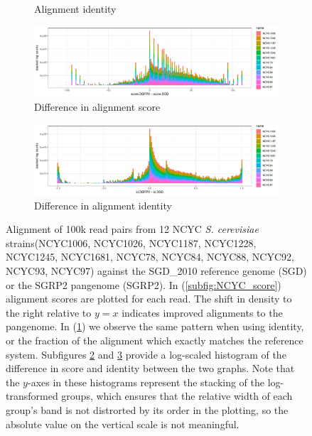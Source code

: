 \begin{figure}[htbp!]
\begin{subfigure}[t]{0.49\textwidth}
    \caption{Alignment identity} \label{subfig:NCYC_identity}
  \end{subfigure}
  \begin{subfigure}[t]{1.0\textwidth}
    \includegraphics[width=1.0\textwidth]{Chapter3/Figs/NCYC_SGRP2_SGD_comparison_score_hist_color.pdf}
    \caption{Difference in alignment score} \label{subfig:NCYC_score_diff_hist}
  \end{subfigure}
  \begin{subfigure}[t]{1.0\textwidth}
    \includegraphics[width=1.0\textwidth]{Chapter3/Figs/NCYC_SGRP2_SGD_comparison_id_hist_color.pdf}
    \caption{Difference in alignment identity} \label{subfig:NCYC_id_diff_hist}
  \end{subfigure}
  \caption[Comparing alignment to the linear reference and SGRP2]{
    Alignment of 100k read pairs from 12 NCYC \emph{S. cerevisiae} strains(NCYC1006, NCYC1026, NCYC1187, NCYC1228, NCYC1245, NCYC1681, NCYC78, NCYC84, NCYC88, NCYC92, NCYC93, NCYC97) against the SGD\_2010 reference genome (SGD) or the SGRP2 pangenome (SGRP2).
    In (\ref{subfig:NCYC_score}) alignment scores are plotted for each read.
    The shift in density to the right relative to $y=x$ indicates improved alignments to the pangenome.
    In (\ref{subfig:NCYC_identity}) we observe the same pattern when using identity, or the fraction of the alignment which exactly matches the reference system.
    Subfigures \ref{subfig:NCYC_score_diff_hist} and \ref{subfig:NCYC_id_diff_hist} provide a log-scaled histogram of the difference in score and identity between the two graphs.
    Note that the $y$-axes in these histograms represent the stacking of the log-transformed groups, which ensures that the relative width of each group's band is not distrorted by its order in the plotting, so the absolute value on the vertical scale is not meaningful.
  }
\label{fig:NCYC_SGD_SGRP2}
\end{figure}

